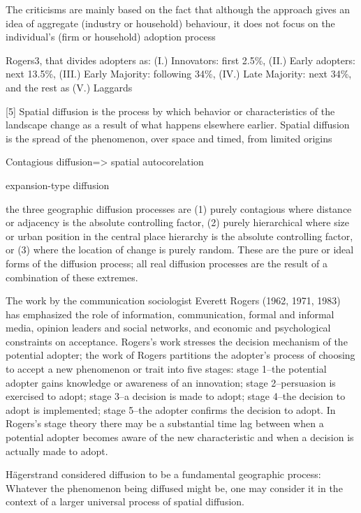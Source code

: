 \documentclass[10pt,letterpaper]{article}
\begin{document}
The criticisms are mainly based on the fact that although the approach
gives an idea of aggregate (industry or household) behaviour, it does
not focus on the individual's (firm or household) adoption process

Rogers3, that divides adopters as: (I.) Innovators: first 2.5\%, (II.)
Early adopters: next 13.5\%, (III.) Early Majority: following 34\%,
(IV.) Late Majority: next 34\%, and the rest as (V.) Laggards

{[}5{]} Spatial diffusion is the process by which behavior or
characteristics of the landscape change as a result of what happens
elsewhere earlier. Spatial diffusion is the spread of the phenomenon,
over space and timed, from limited origins

Contagious diffusion=\textgreater{} spatial autocorelation

expansion-type diffusion

the three geographic diffusion processes are (1) purely contagious where
distance or adjacency is the absolute controlling factor, (2) purely
hierarchical where size or urban position in the central place hierarchy
is the absolute controlling factor, or (3) where the location of change
is purely random. These are the pure or ideal forms of the diffusion
process; all real diffusion processes are the result of a combination of
these extremes.

The work by the communication sociologist Everett Rogers (1962, 1971,
1983) has emphasized the role of information, communication, formal and
informal media, opinion leaders and social networks, and economic and
psychological constraints on acceptance. Rogers's work stresses the
decision mechanism of the potential adopter; the work of Rogers
partitions the adopter's process of choosing to accept a new phenomenon
or trait into five stages: stage 1--the potential adopter gains
knowledge or awareness of an innovation; stage 2--persuasion is
exercised to adopt; stage 3--a decision is made to adopt; stage 4--the
decision to adopt is implemented; stage 5--the adopter confirms the
decision to adopt. In Rogers's stage theory there may be a substantial
time lag between when a potential adopter becomes aware of the new
characteristic and when a decision is actually made to adopt.

Hägerstrand considered diffusion to be a fundamental geographic process:
Whatever the phenomenon being diffused might be, one may consider it in
the context of a larger universal process of spatial diffusion.
\end{document}
